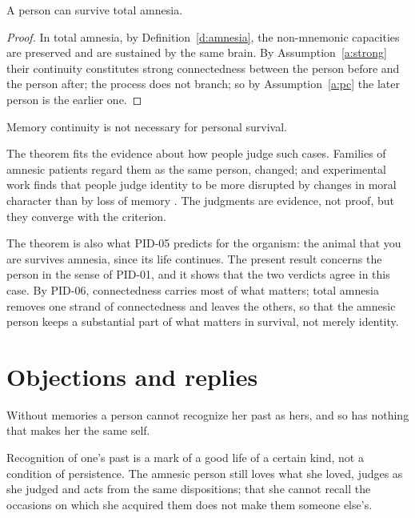 \documentclass{situationist-preprint}
\begin{document}
\begin{theorem}\label{t:main}
A person can survive total amnesia.
\end{theorem}

\begin{proof}
In total amnesia, by Definition~\ref{d:amnesia}, the non-mnemonic capacities are preserved and are sustained by the same brain. By Assumption~\ref{a:strong} their continuity constitutes strong connectedness between the person before and the person after; the process does not branch; so by Assumption~\ref{a:pc} the later person is the earlier one.
\end{proof}

\begin{corollary}\label{c:notnec}
Memory continuity is not necessary for personal survival.
\end{corollary}

The theorem fits the evidence about how people judge such cases. Families of amnesic patients regard them as the same person, changed; and experimental work finds that people judge identity to be more disrupted by changes in moral character than by loss of memory \citep{StrohmingerNichols2014}. The judgments are evidence, not proof, but they converge with the criterion.

The theorem is also what PID-05 predicts for the organism: the animal that you are survives amnesia, since its life continues. The present result concerns the person in the sense of PID-01, and it shows that the two verdicts agree in this case. By PID-06, connectedness carries most of what matters; total amnesia removes one strand of connectedness and leaves the others, so that the amnesic person keeps a substantial part of what matters in survival, not merely identity.

\section{Objections and replies}\label{s:obj}

\begin{objection}
Without memories a person cannot recognize her past as hers, and so has nothing that makes her the same self.
\end{objection}

\begin{reply}
Recognition of one's past is a mark of a good life of a certain kind, not a condition of persistence. The amnesic person still loves what she loved, judges as she judged and acts from the same dispositions; that she cannot recall the occasions on which she acquired them does not make them someone else's.
\end{reply}
\end{document}
